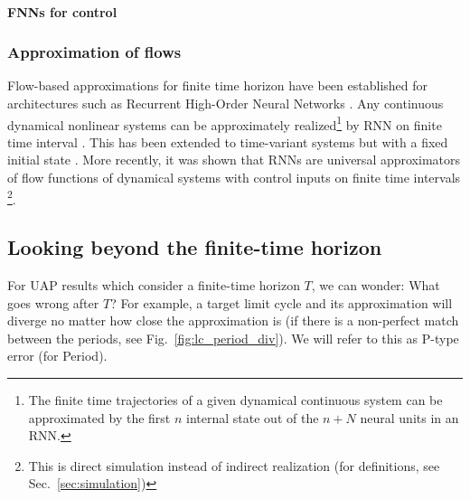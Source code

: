 \documentclass{article}
\theoremstyle{definition} \newtheorem{definition}{Definition}
\theoremstyle{remark} \newtheorem{remark}{Remark}
\newcommand{\reals}{\mathbb{R}}
\newcounter{ct}
\begin{document}
\paragraph{FNNs for control}
\citep{psaltis1988multilayered} \citep{li1989control,chen1992adaptive}




\subsubsection{Approximation of flows}%
Flow-based approximations for finite time horizon have been established for architectures such as Recurrent High-Order Neural Networks \citep{kosmatopoulos1995structural}.
Any continuous dynamical nonlinear systems can be approximately realized\footnote{The finite time trajectories of a given dynamical continuous system can be approximated by the first $n$ internal state out of the $n + N$ neural units in an RNN.} by RNN on finite time interval \citep{chow2000modeling}.
%
This has been extended to time-variant systems but with a fixed initial state \citep{li2005approximation}. %
%
More recently, it was shown that RNNs are universal approximators of flow functions of dynamical systems  with control inputs on finite time intervals  \citep{aguiar2023universal}\footnote{This is direct simulation instead of indirect realization (for definitions, see Sec.~\ref{sec:simulation})}. %


\subsection{Looking beyond the finite-time horizon}\label{sec:beyondfinitetime}

For UAP results which consider a finite-time horizon $T$, we can wonder: What goes wrong after $T$?
%
For example, a target limit cycle and its approximation will diverge no matter how close the approximation is (if there is a non-perfect match between the periods, see Fig.~\ref{fig:lc_period_div}).
We will refer to this as P-type error (for Period).
\end{document}
